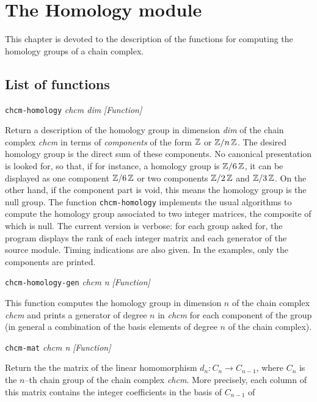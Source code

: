 \chapter {The Homology module}

This chapter is devoted to the description of the functions for
computing the homology groups of a chain complex.

\section {List of functions}

{\parindent=0mm
{\leftskip=5mm
{\tt chcm-homology} {\em chcm dim} \hfill {\em [Function]} \par}
{\leftskip=15mm
Return a description  of the homology group in dimension {\em dim} of the chain complex {\em chcm}
in terms of {\em components} of the form ${\mathbb{Z}}$ or ${\mathbb{Z}}/{n\, {\mathbb{Z}}}$.
The desired homology group is the direct sum of these
components. No canonical presentation is looked for, so that, if for instance,
a homology group is ${\mathbb{Z}}/{6\, {\mathbb{Z}}}$, it can be displayed as one component
${\mathbb{Z}}/{6\, {\mathbb{Z}}}$ or two components ${\mathbb{Z}}/{2\, {\mathbb{Z}}}$ and ${\mathbb{Z}}/{3\, {\mathbb{Z}}}$.
On the other hand, if the component part  is void, this  means  the homology
group is the null group. The function {\tt chcm-homology} implements the
usual algorithms to compute the homology group associated to two integer matrices,
the composite of which is null. The current version is verbose: for each group asked for,
the program displays the rank of each integer matrix and each generator of the source
module. Timing indications are also given. In the examples, only the  components are printed.
\par }
{\leftskip=5mm
{\tt chcm-homology-gen} {\em chcm n} \hfill {\em [Function]} \par}
{\leftskip=15mm
This function computes the homology group in dimension $n$ of the chain complex
{\em chcm} and prints a generator of degree $n$ in {\em chcm} for each component of
the group (in general a combination of the  basis elements of degree $n$ of the
chain complex).\par}
{\leftskip=5mm
{\tt chcm-mat} {\em chcm n} \hfill {\em [Function]} \par}
{\leftskip=15mm
Return the   the  matrix of the li\-ne\-ar homomorphism
$d_n: C_n \rightarrow C_{n-1}$, where
$C_n$ is the $n$--th chain group   of the chain complex  {\em chcm}. More precisely,
each column  of this matrix contains the integer coefficients in the basis of $C_{n-1}$ of
}}
